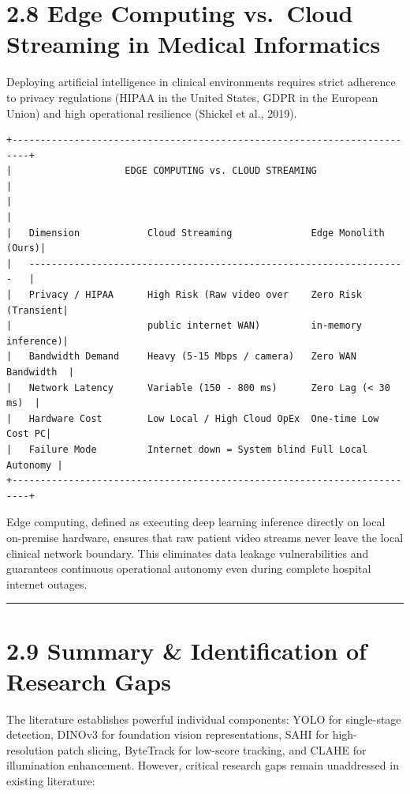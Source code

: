 \section{2.8 Edge Computing vs.~Cloud Streaming in Medical
Informatics}\label{edge-computing-vs.-cloud-streaming-in-medical-informatics}

Deploying artificial intelligence in clinical environments requires
strict adherence to privacy regulations (HIPAA in the United States,
GDPR in the European Union) and high operational resilience (Shickel et
al., 2019).

\begin{verbatim}
+-------------------------------------------------------------------------+
|                    EDGE COMPUTING vs. CLOUD STREAMING                   |
|                                                                         |
|   Dimension            Cloud Streaming              Edge Monolith (Ours)|
|   -------------------------------------------------------------------   |
|   Privacy / HIPAA      High Risk (Raw video over    Zero Risk (Transient|
|                        public internet WAN)         in-memory inference)|
|   Bandwidth Demand     Heavy (5-15 Mbps / camera)   Zero WAN Bandwidth  |
|   Network Latency      Variable (150 - 800 ms)      Zero Lag (< 30 ms)  |
|   Hardware Cost        Low Local / High Cloud OpEx  One-time Low Cost PC|
|   Failure Mode         Internet down = System blind Full Local Autonomy |
+-------------------------------------------------------------------------+
\end{verbatim}

Edge computing, defined as executing deep learning inference directly on
local on-premise hardware, ensures that raw patient video streams never
leave the local clinical network boundary. This eliminates data leakage
vulnerabilities and guarantees continuous operational autonomy even
during complete hospital internet outages.

\begin{center}\rule{0.5\linewidth}{0.5pt}\end{center}

\section{2.9 Summary \& Identification of Research
Gaps}\label{summary-identification-of-research-gaps}

The literature establishes powerful individual components: YOLO for
single-stage detection, DINOv3 for foundation vision representations,
SAHI for high-resolution patch slicing, ByteTrack for low-score
tracking, and CLAHE for illumination enhancement. However, critical
research gaps remain unaddressed in existing literature:

